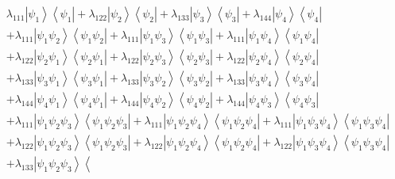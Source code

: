 \documentclass[aps,preprint]{revtex4}%
\begin{document}
\begin{align}
& \lambda_{111}\left\vert \psi_{1}\right\rangle \left\langle \psi
_{1}\right\vert +\lambda_{122}\left\vert \psi_{2}\right\rangle \left\langle
\psi_{2}\right\vert +\lambda_{133}\left\vert \psi_{3}\right\rangle
\left\langle \psi_{3}\right\vert +\lambda_{144}\left\vert \psi_{4}%
\right\rangle \left\langle \psi_{4}\right\vert \nonumber\\
& +\lambda_{111}\left\vert \psi_{1}\psi_{2}\right\rangle \left\langle \psi
_{1}\psi_{2}\right\vert +\lambda_{111}\left\vert \psi_{1}\psi_{3}\right\rangle
\left\langle \psi_{1}\psi_{3}\right\vert +\lambda_{111}\left\vert \psi_{1}%
\psi_{4}\right\rangle \left\langle \psi_{1}\psi_{4}\right\vert \nonumber\\
& +\lambda_{122}\left\vert \psi_{2}\psi_{1}\right\rangle \left\langle \psi
_{2}\psi_{1}\right\vert +\lambda_{122}\left\vert \psi_{2}\psi_{3}\right\rangle
\left\langle \psi_{2}\psi_{3}\right\vert +\lambda_{122}\left\vert \psi_{2}%
\psi_{4}\right\rangle \left\langle \psi_{2}\psi_{4}\right\vert \nonumber\\
& +\lambda_{133}\left\vert \psi_{3}\psi_{1}\right\rangle \left\langle \psi
_{3}\psi_{1}\right\vert +\lambda_{133}\left\vert \psi_{3}\psi_{2}\right\rangle
\left\langle \psi_{3}\psi_{2}\right\vert +\lambda_{133}\left\vert \psi_{3}%
\psi_{4}\right\rangle \left\langle \psi_{3}\psi_{4}\right\vert \nonumber\\
& +\lambda_{144}\left\vert \psi_{4}\psi_{1}\right\rangle \left\langle \psi
_{4}\psi_{1}\right\vert +\lambda_{144}\left\vert \psi_{4}\psi_{2}\right\rangle
\left\langle \psi_{4}\psi_{2}\right\vert +\lambda_{144}\left\vert \psi_{4}%
\psi_{3}\right\rangle \left\langle \psi_{4}\psi_{3}\right\vert \nonumber\\
& +\lambda_{111}\left\vert \psi_{1}\psi_{2}\psi_{3}\right\rangle \left\langle
\psi_{1}\psi_{2}\psi_{3}\right\vert +\lambda_{111}\left\vert \psi_{1}\psi
_{2}\psi_{4}\right\rangle \left\langle \psi_{1}\psi_{2}\psi_{4}\right\vert
+\lambda_{111}\left\vert \psi_{1}\psi_{3}\psi_{4}\right\rangle \left\langle
\psi_{1}\psi_{3}\psi_{4}\right\vert \nonumber\\
& +\lambda_{122}\left\vert \psi_{1}\psi_{2}\psi_{3}\right\rangle \left\langle
\psi_{1}\psi_{2}\psi_{3}\right\vert +\lambda_{122}\left\vert \psi_{1}\psi
_{2}\psi_{4}\right\rangle \left\langle \psi_{1}\psi_{2}\psi_{4}\right\vert
+\lambda_{122}\left\vert \psi_{1}\psi_{3}\psi_{4}\right\rangle \left\langle
\psi_{1}\psi_{3}\psi_{4}\right\vert \nonumber\\
& +\lambda_{133}\left\vert \psi_{1}\psi_{2}\psi_{3}\right\rangle \left\langle

\end{align}
\end{document}

